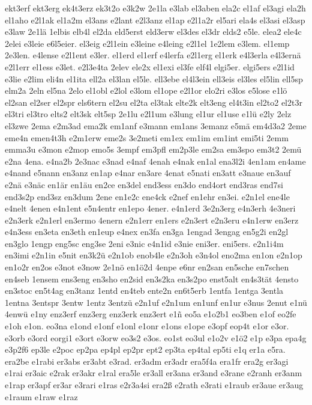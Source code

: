 {ekt3erf
ekt3erg
ek4t3erz
ek3t2o
e3k2w
2e1la
e3lab
el3aben
ela2c
el1af
el3agi
ela2h
el1aho
e2l1ak
el1a2m
el3ans
e2lant
e2l3anz
el1ap
e2l1a2r
el5ari
ela4s
el3asi
el3asp
e3law
2e1lä
1elbis
elb4l
el2da
eld5erst
eld3erw
el3des
el3dr
elds2
e5le.
elea2
ele4c
2elei
e3leie
e6l5eier.
el3eig
e2l1ein
e3leine
e4leing
e2l1el
1e2lem
e3lem.
el1emp
2e3len.
e4lense
e2l1ent
e3ler.
el1erd
el1erf
e4lerfa
e2l1erg
el1erk
e4l3erla
e4l3ernä
e2l1err
el1ess
e3let.
e2l3e4ta
2elev
ele2x
el1exi
el3fe
elf4l
elgi5er.
elgi5ers
e2l1id
e3lie
e2lim
eli4n
el1ita
ell2a
el3lan
el5le.
ell3ebe
el4l3ein
ell3eis
el3les
el5lin
ell5sp
elm2a
2eln
el5na
2elo
el1obl
e2lol
e3lom
el1ope
e2l1or
elo2ri
e3los
e5lose
e1lö
el2san
el2ser
el2spr
els6tern
el2su
el2ta
el3tak
elte2k
elt3eng
el4t3in
el2to2
el2t3r
el3tri
el3tro
elts2
elt3sk
elt5sp
2e1lu
e2l1um
e3lung
el1ur
el1use
e1lü
e2ly
2elz
el3zwe
2ema
e2m3ad
ema2k
em1anf
e3mann
em1ans
3emanz
e5mä
em4d3a2
2eme
eme4n
emen4t3h
e2m1erw
eme2s
3e2meti
em1ex
em1im
em1int
emi5ti
2emm
emma3u
e3mon
e2mop
emo5s
3empf
em3pfl
em2p3le
em2sa
em3spo
em3t2
2emü
e2na
4ena.
e4na2b
2e3nac
e3nad
e4naf
4enah
e4nak
en1al
ena3l2i
4en1am
en4ame
e4nand
e5nann
en3anz
en1ap
e4nar
en3are
4enat
e5nati
en3att
e3naue
en3auf
e2nä
e3näc
en1är
en1äu
en2ce
en3del
end3ess
en3do
end4ort
end3ras
end7si
end3s2p
end3sz
en3dum
2ene
en1e2c
ene4ck
e2nef
en1ehr
en3ei.
e2n1el
ene4le
e4nelt
4enen
e4n1ent
e5n4entr
en1epo
4ener.
e4n1erd
3e2n3erg
e4n3erh
4e3neri
e2n3erk
e2n1erl
en3ermo
4enern
e2n1err
en1ers
e2n3ert
e2n3eru
e4n1erw
en3erz
e4n3ess
en3eta
en3eth
en1eup
e4nex
en3fa
en3ga
1engad
3engag
en5g2i
en2gl
en3glo
1engp
eng5sc
eng3se
2eni
e3nic
e4n1id
e3nie
eni3er.
eni5ers.
e2n1i4m
en3imi
e2n1in
e5nit
en3k2ü
e2n1ob
enob4le
e2n3oh
e3n4ol
eno2ma
en1on
e2n1op
en1o2r
en2os
e3not
e3now
2e1nö
en1ö2d
4enpe
e6nr
en2san
en5sche
en7schen
en4seb
1ensem
ens3eng
en3sho
en2sid
en3s2ka
en3s2po
enst5alt
en4s3tät
4ensto
en3stoc
en5t4ag
en3tanz
1entd
en4teb
ente2n
en6t5erb
1entfa
1entga
3entla
1entna
3entspr
3entw
1entz
3entzü
e2n1uf
e2n1um
en1unf
en1ur
e3nus
2enut
e1nü
4enwü
e1ny
enz3erf
enz3erg
enz3erk
enz3ert
e1ñ
eo5a
e1o2b1
eo3ben
e1of
eo2fe
e1oh
e1on.
eo3na
e1ond
e1onf
e1onl
e1onr
e1ons
e1ope
e3opf
eop4t
e1or
e3or.
e3orb
e3ord
eorgi1
e3ort
e3orw
eo3s2
e3os.
eo1st
eo3ul
e1o2v
e1ö2
e1p
e3pa
epa4g
e3p2f6
ep3le
e2poc
ep2pa
ep4pl
ep2pr
ept2
ep3ta
ep4tal
ep5ti
e1q
er1a
e5ra.
era2be
e1rabi
er3abs
er3abt
e3rad.
er3adm
er3adr
era5f4a
era1fr
era2g
er3agi
e1rai
er3aic
e2rak
er3akr
e1ral
era5le
er3all
er3ana
er3and
e3rane
e2ranh
er3anm
e1rap
er3apf
er3ar
e3rari
e1ras
e2r3a4si
era2ß
e2rath
e3rati
e1raub
er3aue
er3aug
e1raum
e1raw
e1raz
}

